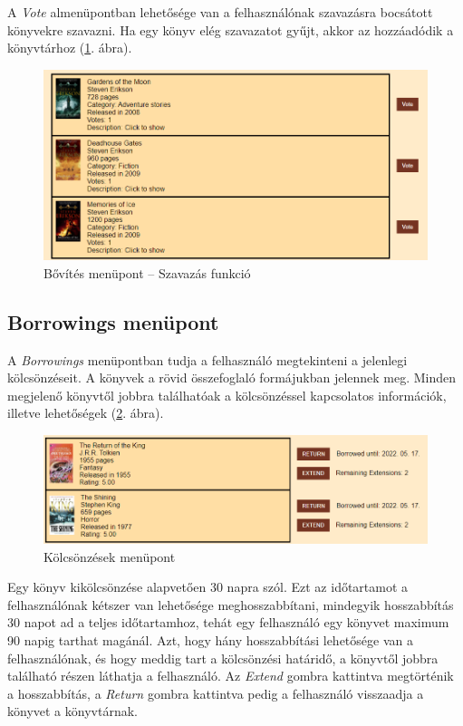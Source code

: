 A \textit{Vote} almenüpontban lehetősége van a felhasználónak szavazásra bocsátott könyvekre szavazni. Ha egy könyv elég szavazatot gyűjt, akkor az hozzáadódik a könyvtárhoz (\ref{fig:expand}. ábra).

\begin{figure}[h]
    \centering
    \includegraphics[scale=0.6]{images/application/expand.png}
    \caption{Bővítés menüpont -- Szavazás funkció}
    \label{fig:expand}
\end{figure}

\subsection{Borrowings menüpont}

A \textit{Borrowings} menüpontban tudja a felhasználó megtekinteni a jelenlegi kölcsönzéseit. A könyvek a rövid összefoglaló formájukban jelennek meg. Minden megjelenő könyvtől jobbra találhatóak a kölcsönzéssel kapcsolatos információk, illetve lehetőségek (\ref{fig:borrowings}. ábra). 

\begin{figure}[h]
    \centering
    \includegraphics[scale=0.6]{images/application/borrowings.png}
    \caption{Kölcsönzések menüpont}
    \label{fig:borrowings}
\end{figure}

Egy könyv kikölcsönzése alapvetően 30 napra szól. Ezt az időtartamot a felhasználónak kétszer van lehetősége meghosszabbítani, mindegyik hosszabbítás 30 napot ad a teljes időtartamhoz, tehát egy felhasználó egy könyvet maximum 90 napig tarthat magánál. Azt, hogy hány hosszabbítási lehetősége van a felhasználónak, és hogy meddig tart a kölcsönzési határidő, a könyvtől jobbra található részen láthatja a felhasználó. Az \textit{Extend} gombra kattintva megtörténik a hosszabbítás, a \textit{Return} gombra kattintva pedig a felhasználó visszaadja a könyvet a könyvtárnak. 

